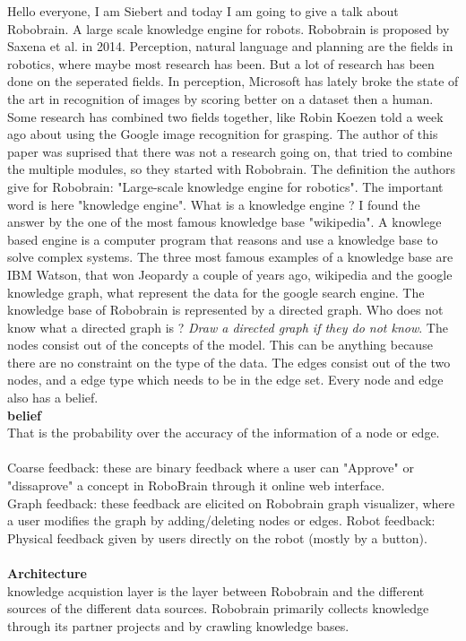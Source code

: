 \documentclass[10pt]{article}
\begin{document}
Hello everyone, I am Siebert and
today I am going to give a talk about Robobrain. A large scale knowledge engine for robots. Robobrain is proposed by Saxena et al. in 2014. Perception, natural language and planning are the fields in robotics, where maybe most research has been. But a lot of research has been done on the seperated fields. In perception, Microsoft has lately broke the state of the art in recognition of images by scoring better on a dataset then a human. Some research has combined two fields together, like Robin Koezen told a week ago about using the Google image recognition for grasping.  The author of this paper was suprised that there was not a research going on, that tried to combine the multiple modules, so they started with Robobrain. The definition the authors give for Robobrain: "Large-scale knowledge engine for robotics". The important word is here "knowledge engine". What is a knowledge engine ? I found the answer by the one of the most famous knowledge base "wikipedia". A knowlege based engine is a computer program that reasons and use a knowledge base to solve complex systems. The three most famous examples of a knowledge base are IBM Watson, that won Jeopardy a couple of years ago, wikipedia and the google knowledge graph, what represent the data for the google search engine. The knowledge base of Robobrain is represented by a directed graph. Who does not know what a directed graph is ?
\textit{Draw a directed graph if they do not know}. 
The nodes consist out of the concepts of the model. This can be anything because there are no constraint on the type of the data.  The edges consist out of the two nodes, and a edge type which needs to be in the edge set. Every node and edge also has a belief.\\
\textbf{belief}\\
That is the probability over the accuracy of the information of a node or edge. \\\\
Coarse feedback: these are binary feedback where a user can "Approve" or "dissaprove" a concept in RoboBrain through it online web interface.\\
Graph feedback: these feedback are elicited on Robobrain graph visualizer, where a user modifies the graph by adding/deleting nodes or edges. 
Robot feedback: Physical feedback given by users directly on the robot (mostly by a button).\\\\
\textbf{Architecture}\\
knowledge acquistion layer is the layer between Robobrain and the different sources of the different data sources. Robobrain primarily collects knowledge through its partner projects and by crawling knowledge bases.\\
\end{document}
